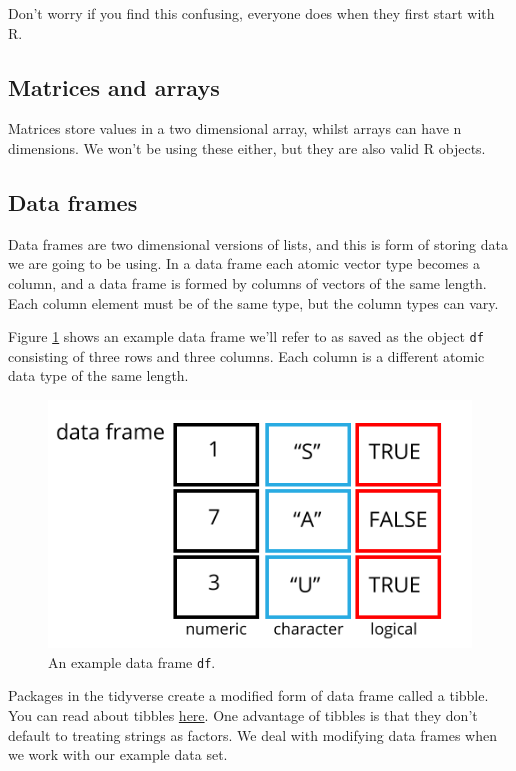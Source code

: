\documentclass[12pt,]{book}
\theoremstyle{definition}
\theoremstyle{definition}
\theoremstyle{definition}
\theoremstyle{remark}
\begin{document}
Don't worry if you find this confusing, everyone does when they first
start with R.

\subsection{Matrices and arrays}\label{matrices-and-arrays}

Matrices store values in a two dimensional array, whilst arrays can have
n dimensions. We won't be using these either, but they are also valid R
objects.

\subsection{Data frames}\label{data-frames}

Data frames are two dimensional versions of lists, and this is form of
storing data we are going to be using. In a data frame each atomic
vector type becomes a column, and a data frame is formed by columns of
vectors of the same length. Each column element must be of the same
type, but the column types can vary.

Figure \ref{fig:df} shows an example data frame we'll refer to as saved
as the object \texttt{df} consisting of three rows and three columns.
Each column is a different atomic data type of the same length.



\begin{figure}

{\centering \includegraphics[width=0.8\linewidth]{img/data_frame} 

}

\caption{An example data frame \texttt{df}.}\label{fig:df}
\end{figure}

Packages in the tidyverse create a modified form of data frame called a
tibble. You can read about tibbles
\href{http://r4ds.had.co.nz/tibbles.html}{here}. One advantage of
tibbles is that they don't default to treating strings as factors. We
deal with modifying data frames when we work with our example data set.
\end{document}
